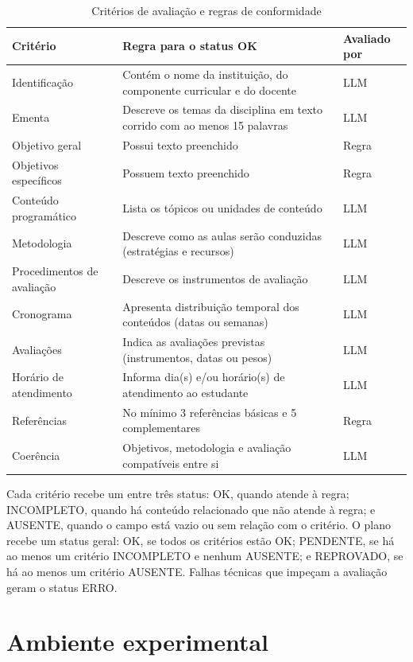 \begin{table}[H]
\centering
\caption{Critérios de avaliação e regras de conformidade}
\label{tab:criterios}
\footnotesize
\begin{tabular}{@{}L{3.3cm}L{9.0cm}L{2.0cm}@{}}
\toprule
{}
\textbf{Critério} & \textbf{Regra para o status OK} & \textbf{Avaliado por} \\ \midrule
Identificação & Contém o nome da instituição, do componente curricular e do docente & LLM \\
Ementa & Descreve os temas da disciplina em texto corrido com ao menos 15 palavras & LLM \\
Objetivo geral & Possui texto preenchido & Regra \\
Objetivos específicos & Possuem texto preenchido & Regra \\
Conteúdo programático & Lista os tópicos ou unidades de conteúdo & LLM \\
Metodologia & Descreve como as aulas serão conduzidas (estratégias e recursos) & LLM \\
Procedimentos de avaliação & Descreve os instrumentos de avaliação & LLM \\
Cronograma & Apresenta distribuição temporal dos conteúdos (datas ou semanas) & LLM \\
Avaliações & Indica as avaliações previstas (instrumentos, datas ou pesos) & LLM \\
Horário de atendimento & Informa dia(s) e/ou horário(s) de atendimento ao estudante & LLM \\
Referências & No mínimo 3 referências básicas e 5 complementares & Regra \\
Coerência & Objetivos, metodologia e avaliação compatíveis entre si & LLM \\ \bottomrule
\end{tabular}
\end{table}

Cada critério recebe um entre três status: OK, quando atende à regra; INCOMPLETO, quando há conteúdo relacionado que não atende à regra; e AUSENTE, quando o campo está vazio ou sem relação com o critério. O plano recebe um status geral: OK, se todos os critérios estão OK; PENDENTE, se há ao menos um critério INCOMPLETO e nenhum AUSENTE; e REPROVADO, se há ao menos um critério AUSENTE. Falhas técnicas que impeçam a avaliação geram o status ERRO.

\section{Ambiente experimental}

